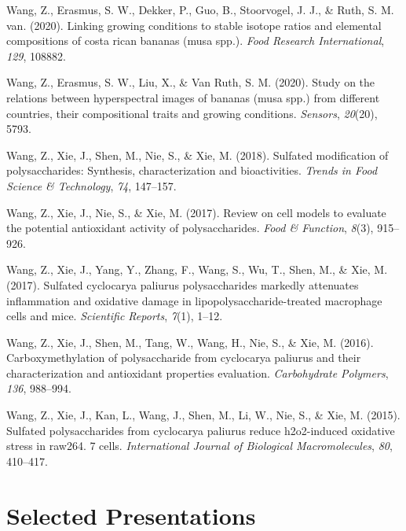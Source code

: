 \documentclass[11pt, a4paper]{awesome-cv}
\begin{document}
\begingroup
\setlength{\parindent}{-0.5in}
\setlength{\leftskip}{0.5in}

\hypertarget{refs_published}{}
\leavevmode\hypertarget{ref-wang2020linking}{}%
Wang, Z., Erasmus, S. W., Dekker, P., Guo, B., Stoorvogel, J. J., \&
Ruth, S. M. van. (2020). Linking growing conditions to stable isotope
ratios and elemental compositions of costa rican bananas (musa spp.).
\emph{Food Research International}, \emph{129}, 108882.

\leavevmode\hypertarget{ref-wang2020study}{}%
Wang, Z., Erasmus, S. W., Liu, X., \& Van Ruth, S. M. (2020). Study on
the relations between hyperspectral images of bananas (musa spp.) from
different countries, their compositional traits and growing conditions.
\emph{Sensors}, \emph{20}(20), 5793.

\leavevmode\hypertarget{ref-wang2018sulfated}{}%
Wang, Z., Xie, J., Shen, M., Nie, S., \& Xie, M. (2018). Sulfated
modification of polysaccharides: Synthesis, characterization and
bioactivities. \emph{Trends in Food Science \& Technology}, \emph{74},
147--157.

\leavevmode\hypertarget{ref-wang2017review}{}%
Wang, Z., Xie, J., Nie, S., \& Xie, M. (2017). Review on cell models to
evaluate the potential antioxidant activity of polysaccharides.
\emph{Food \& Function}, \emph{8}(3), 915--926.

\leavevmode\hypertarget{ref-wang2017sulfated}{}%
Wang, Z., Xie, J., Yang, Y., Zhang, F., Wang, S., Wu, T., Shen, M., \&
Xie, M. (2017). Sulfated cyclocarya paliurus polysaccharides markedly
attenuates inflammation and oxidative damage in
lipopolysaccharide-treated macrophage cells and mice. \emph{Scientific
Reports}, \emph{7}(1), 1--12.

\leavevmode\hypertarget{ref-wang2016carboxymethylation}{}%
Wang, Z., Xie, J., Shen, M., Tang, W., Wang, H., Nie, S., \& Xie, M.
(2016). Carboxymethylation of polysaccharide from cyclocarya paliurus
and their characterization and antioxidant properties evaluation.
\emph{Carbohydrate Polymers}, \emph{136}, 988--994.

\leavevmode\hypertarget{ref-wang2015sulfated}{}%
Wang, Z., Xie, J., Kan, L., Wang, J., Shen, M., Li, W., Nie, S., \& Xie,
M. (2015). Sulfated polysaccharides from cyclocarya paliurus reduce
h2o2-induced oxidative stress in raw264. 7 cells. \emph{International
Journal of Biological Macromolecules}, \emph{80}, 410--417.

\endgroup

\hypertarget{selected-presentations}{%
\section{Selected Presentations}\label{selected-presentations}}
\end{document}
